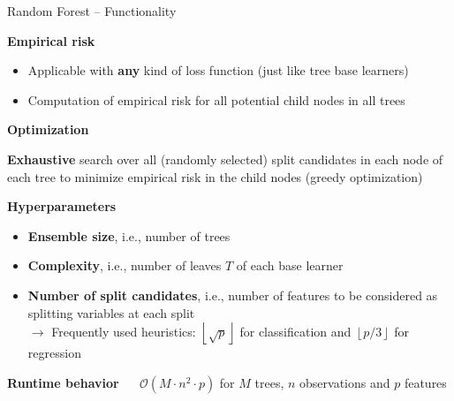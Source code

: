 \documentclass[11pt,compress,t,notes=noshow, xcolor=table]{beamer}
\newcommand{\highlight}[1]{\textcolor{highlightcol}{\textbf{#1}}}
\begin{document}

\begin{frame}{Random Forest -- Functionality}

\footnotesize

\highlight{Empirical risk}

\begin{itemize}
  \item Applicable with \textbf{any} kind of loss function (just like tree base 
  learners)
  \item Computation of empirical risk for all potential child nodes in all trees
\end{itemize}

\medskip

\highlight{Optimization}

\textbf{Exhaustive} search over
all (randomly selected) split candidates in each node of each tree to minimize
empirical risk in the child nodes (greedy optimization) \\

\medskip

\highlight{Hyperparameters}

\begin{itemize}
  \item \textbf{Ensemble size}, i.e., number of trees
  \item \textbf{Complexity}, i.e., number of leaves $T$ of each base learner
  \item \textbf{Number of split candidates}, i.e., number of features to be
  considered as splitting variables at each split \\
  $\rightarrow$ Frequently used heuristics: 
  $\left \lfloor{\sqrt{p}}\right \rfloor$ for classification and
  $\left \lfloor{p/3}\right \rfloor$ for regression
\end{itemize}

\medskip

\highlight{Runtime behavior} ~~
$\mathcal{O}(M \cdot n^2 \cdot p)$ for $M$ trees, $n$ observations and $p$ 
features
  
\end{frame}


\end{document}
